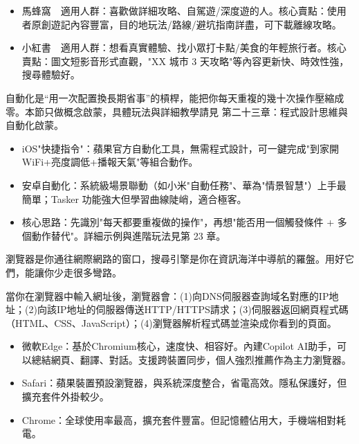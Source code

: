 \begin{itemize}
  \item 馬蜂窩　適用人群：喜歡做詳細攻略、自駕遊/深度遊的人。核心賣點：使用者原創遊記內容豐富，目的地玩法/路線/避坑指南詳盡，可下載離線攻略。
  \item 小紅書　適用人群：想看真實體驗、找小眾打卡點/美食的年輕旅行者。核心賣點：圖文短影音形式直觀，"XX 城市 3 天攻略"等內容更新快、時效性強，搜尋體驗好。
\end{itemize}


自動化是“用一次配置換長期省事”的槓桿，能把你每天重複的幾十次操作壓縮成零。本節只做概念啟蒙，具體玩法與詳細教學請見 第二十三章：程式設計思維與自動化啟蒙。

\begin{itemize}
  \item iOS"快捷指令"：蘋果官方自動化工具，無需程式設計，可一鍵完成"到家開 WiFi+亮度調低+播報天氣"等組合動作。
  \item 安卓自動化：系統級場景聯動（如小米"自動任務"、華為"情景智慧"）上手最簡單；Tasker 功能強大但學習曲線陡峭，適合極客。
  \item 核心思路：先識別"每天都要重複做的操作"，再想"能否用一個觸發條件 + 多個動作替代"。詳細示例與進階玩法見第 23 章。
\end{itemize}


瀏覽器是你通往網際網路的窗口，搜尋引擎是你在資訊海洋中導航的羅盤。用好它們，能讓你少走很多彎路。


當你在瀏覽器中輸入網址後，瀏覽器會：(1)向DNS伺服器查詢域名對應的IP地址；(2)向該IP地址的伺服器傳送HTTP/HTTPS請求；(3)伺服器返回網頁程式碼（HTML、CSS、JavaScript）；(4)瀏覽器解析程式碼並渲染成你看到的頁面。


\begin{itemize}
  \item 微軟Edge：基於Chromium核心，速度快、相容好。內建Copilot AI助手，可以總結網頁、翻譯、對話。支援跨裝置同步，個人強烈推薦作為主力瀏覽器。
  \item Safari：蘋果裝置預設瀏覽器，與系統深度整合，省電高效。隱私保護好，但擴充套件外掛較少。
  \item Chrome：全球使用率最高，擴充套件豐富。但記憶體佔用大，手機端相對耗電。
\end{itemize}

